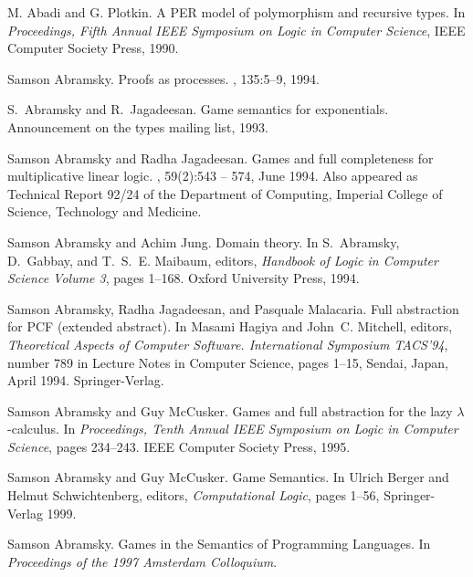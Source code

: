 \documentclass[11pt]{article}
\begin{document}
\begin{thebibliography}{Cur92b}

M. Abadi and G. Plotkin.
\newblock A {\sc PER} model of polymorphism and recursive types.
\newblock  In {\em Proceedings, Fifth Annual IEEE Symposium on Logic in Computer
  Science}, IEEE Computer Society Press, 1990.

Samson Abramsky.
\newblock Proofs as processes.
, 135:5--9, 1994.

S.~Abramsky and R.~Jagadeesan.
\newblock Game semantics for exponentials.
\newblock Announcement on the types mailing list, 1993.

Samson Abramsky and Radha Jagadeesan.
\newblock Games and full completeness for multiplicative linear logic.
, 59(2):543 -- 574, June 1994.
\newblock Also appeared as Technical Report 92/24 of the Department of
  Computing, Imperial College of Science, Technology and Medicine.

Samson Abramsky and Achim Jung.
\newblock Domain theory.
\newblock In S.~Abramsky, D.~Gabbay, and T.~S.~E. Maibaum, editors, {\em
  Handbook of Logic in Computer Science Volume 3}, pages 1--168. Oxford
  University Press, 1994.

Samson Abramsky, Radha Jagadeesan, and Pasquale Malacaria.
\newblock Full abstraction for {PCF} (extended abstract).
\newblock In Masami Hagiya and John~C. Mitchell, editors, {\em Theoretical
  Aspects of Computer Software. International Symposium TACS'94}, number 789 in
  Lecture Notes in Computer Science, pages 1--15, Sendai, Japan, April 1994.
  Springer-Verlag.

Samson Abramsky and Guy McCusker.
\newblock Games and full abstraction for the lazy $\lambda$-calculus.
\newblock In {\em Proceedings, Tenth Annual IEEE Symposium on Logic in Computer
  Science}, pages 234--243. IEEE Computer Society Press, 1995.

Samson Abramsky and Guy McCusker.
\newblock Game Semantics.
\newblock In Ulrich Berger and Helmut Schwichtenberg, editors,
{\em Computational Logic}, pages 1--56, Springer-Verlag 1999.

Samson Abramsky.
\newblock Games in the Semantics of Programming Languages.
\newblock In {\em Proceedings of the 1997 Amsterdam Colloquium}.


\end{thebibliography}
\end{document}
